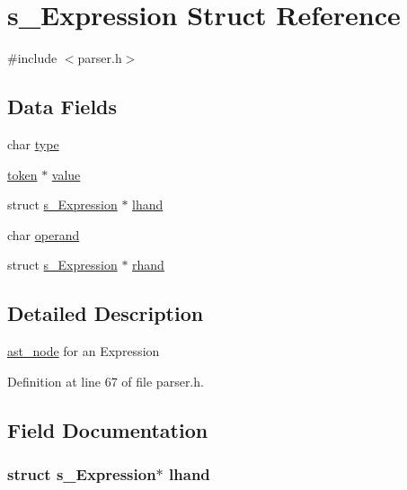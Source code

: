 \hypertarget{structs___expression}{\section{s\+\_\+\+Expression Struct Reference}
\label{structs___expression}
}


{\ttfamily \#include $<$parser.\+h$>$}

\subsection*{Data Fields}
\begin{DoxyCompactItemize}
\item 
char \hyperlink{structs___expression_aff17911edc8208aa8ddb1c7c52c78389}{type}
\item 
\hyperlink{structtoken}{token} $\ast$ \hyperlink{structs___expression_a5968898e6cdff4827c971a18ee650c7e}{value}
\item 
struct \hyperlink{structs___expression}{s\+\_\+\+Expression} $\ast$ \hyperlink{structs___expression_ad96c1e25a469eea152478a4271471f26}{lhand}
\item 
char \hyperlink{structs___expression_a3cad0d01b06faaf8fa705cf1e62daaa1}{operand}
\item 
struct \hyperlink{structs___expression}{s\+\_\+\+Expression} $\ast$ \hyperlink{structs___expression_a89f69d4913e564bf65840ac6e72c7a71}{rhand}
\end{DoxyCompactItemize}


\subsection{Detailed Description}
\hyperlink{structast__node}{ast\+\_\+node} for an Expression 

Definition at line 67 of file parser.\+h.



\subsection{Field Documentation}
\hypertarget{structs___expression_ad96c1e25a469eea152478a4271471f26}{
\subsubsection[{lhand}]{\setlength{\rightskip}{0pt plus 5cm}struct {\bf s\+\_\+\+Expression}$\ast$ lhand}}\label{structs___expression_ad96c1e25a469eea152478a4271471f26}


